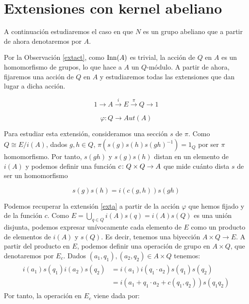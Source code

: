 
\section{Extensiones con kernel abeliano}\label{sec:ab}
A continuación estudiaremos el caso en que $N$ es un grupo abeliano que a partir de ahora denotaremos por $A$. 
 
 Por la Observación \ref{extact}, como $\operatorname{Inn}(A)$ es trivial, la acción de $Q$ en $A$ es un homomorfismo de grupos, lo que hace a $A$ un $Q$-módulo. A partir de ahora, fijaremos una acción de $Q$ en $A$ y estudiaremos todas las extensiones que dan lugar a dicha acción.

\begin{equation}\label{exta}
	1\to A\xrightarrow{i} E\xrightarrow{\pi} Q\to 1
\end{equation}

\begin{equation}
	\varphi \colon Q \to Aut(A)
\end{equation}

Para estudiar esta extensión, consideramos una sección $s$ de $\pi$. Como $Q\cong E/i(A)$, dados $g,h\in Q$, $\pi\left(s(g)s(h)s(gh)^{-1}\right) = 1_{Q}$ por ser $\pi$ homomorfismo. Por tanto, $s(gh)$ y $s(g)s(h)$ distan en un elemento de $i(A)$ y podemos definir una función $c\colon Q\times Q\to A$ que mide cuánto dista $s$ de ser un homomorfismo

\begin{equation}
	s(g)s(h) = i\left(c(g,h)\right)s(gh)
\end{equation}

Podemos recuperar la extensión \eqref{exta} a partir de la acción $\varphi$ que hemos fijado y de la función $c$. 
Como $E=\bigcup\limits_{q\in Q} i(A)s(q) = i(A)s(Q)$ es una unión disjunta, podemos expresar unívocamente cada elemento de $E$ como un producto de elementos de $i(A)$ y $s(Q)$. Es decir, tenemos una biyección $A\times Q \to E$. A partir del producto en $E$, podemos definir una operación de grupo en $A\times Q$, que denotaremos por $E_{c}$. Dados $(a_1,q_1),(a_2,q_2)\in A\times Q$ tenemos:
\begin{align}\begin{split}
i(a_1)s(q_1)i(a_2)s(q_2) &= i(a_1)i(q_1\cdot a_2)s(q_1)s(q_2) \\ &= i(a_1+ q_1\cdot a_2 + c(q_1,q_2))s(q_1q_2)
\end{split}\end{align}
\noindent Por tanto, la operación en $E_c$ viene dada por:

